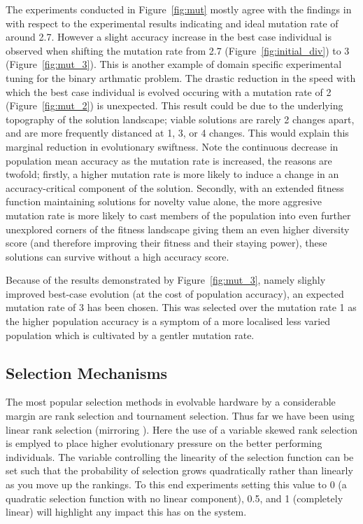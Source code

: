 The experiments conducted in Figure~\ref{fig:mut} mostly agree with the findings
in \cite{10.1007/3-540-63173-9_61} with respect to the experimental results indicating
and ideal mutation rate of around 2.7. However a slight accuracy increase in the
best case individual is
observed when shifting the mutation rate from 2.7 (Figure~\ref{fig:initial_div})
to 3 (Figure~\ref{fig:mut_3}). This is another example of domain specific experimental
tuning for the binary arthmatic problem. The drastic reduction in the speed with which
the best case individual is evolved occuring with a mutation rate of 2
(Figure~\ref{fig:mut_2}) is unexpected. This result could be due to the underlying
topography of the solution landscape; viable solutions are rarely 2 changes apart,
and are more frequently distanced at 1, 3, or 4 changes. This would explain this
marginal reduction in evolutionary swiftness. Note the continuous decrease in population mean accuracy
as the mutation rate is increased, the reasons are twofold; firstly, a higher mutation
rate is more likely to induce a change in an accuracy-critical component of the
solution. Secondly, with an extended fitness function maintaining solutions for
novelty value alone, the more aggresive mutation rate is more likely to cast members of the
population into even further unexplored corners of the fitness landscape giving them
an even higher diversity score (and therefore improving their fitness and their staying power),
these solutions can survive without a high accuracy score.

Because of the results demonstrated by Figure~\ref{fig:mut_3}, namely slighly
improved best-case evolution (at the cost of population accuracy), an expected
mutation rate of 3 has been chosen. This was selected over the mutation rate 1
as the higher population accuracy is a symptom of a more localised less varied
population which is cultivated by a gentler mutation rate.

\subsection{Selection Mechanisms}
The most popular selection methods in evolvable hardware by a considerable margin are
rank selection and tournament selection. Thus far we have been using linear
rank selection (mirroring \cite{10.1007/3-540-63173-9_61}). Here the use
of a variable skewed rank selection is emplyed to place higher evolutionary pressure
on the better performing individuals. The variable controlling the linearity
of the selection function can be set such that the probability of selection
grows quadratically rather than linearly as you move up the rankings. To this
end experiments setting this value to 0 (a quadratic selection function with no linear
component), 0.5, and 1
(completely linear) will highlight any impact this has on the system.

